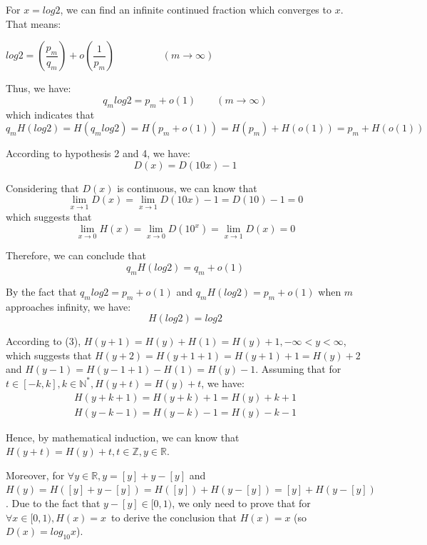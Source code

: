 \documentclass[12pt]{article}
\begin{document}
For $x=log2$, we can find an infinite continued fraction which converges to $x$. That means:\\
\begin{center}
$log2=(\dfrac{p_m}{q_m})+o(\dfrac{1}{p_m})\hspace{2cm}(m\rightarrow\infty)$
\end{center}
Thus, we have:
\begin{equation*}
q_m log2=p_m+o(1)\qquad(m\rightarrow \infty)
\end{equation*}
which indicates that 
\begin{equation*}
q_mH(log2)=H(q_mlog2)=H(p_m+o(1))=H(p_m)+H(o(1))=p_m+H(o(1))
\end{equation*}
\par According to hypothesis 2 and 4, we have:
\begin{equation*}
D(x)=D(10x)-1
\end{equation*}
\par Considering that $D(x)$ is continuous, we can know that
\begin{equation*}
\lim_{x\to1} D(x)=\lim_{x\to1}D(10x)-1=D(10)-1=0
\end{equation*}
which suggests that
\begin{equation*}
\lim_{x\to0}H(x)=\lim_{x\to0}D(10^x)=\lim_{x\to1}D(x)=0
\end{equation*}
\par Therefore, we can conclude that 
\begin{equation*}
q_mH(log2)=q_m+o(1)
\end{equation*}
\par By the fact that $q_m log2=p_m+o(1)$ and $q_mH(log2)=p_m+o(1)$ when $m$ approaches infinity, we have:
\begin{equation*}
H(log2)=log2
\end{equation*}
\par According to (3), $H(y+1)=H(y)+H(1)=H(y)+1, -\infty<y<\infty$, which suggests that $H(y+2)=H(y+1+1)=H(y+1)+1=H(y)+2$ and $H(y-1)=H(y-1+1)-H(1)=H(y)-1$. Assuming that for $t\in [-k,k], k\in \mathbb{N^*}, H(y+t)=H(y)+t$, we have:
\[
\begin{split}
H(y+k+1)=H(y+k)+1=H(y)+k+1 \\
H(y-k-1)=H(y-k)-1=H(y)-k-1
\end{split}
\]
\par Hence, by mathematical induction, we can know that $H(y+t)=H(y)+t, t\in \mathbb{Z}, y\in \mathbb{R}$.
\par Moreover, for $\forall y \in \mathbb{R}, y=[y]+y-[y]$ and $H(y)=H([y]+y-[y])=H([y])+H(y-[y])=[y]+H(y-[y])$. Due to the fact that $y-[y]\in [0,1)$, we only need to prove that for $\forall x \in [0,1), H(x)=x $\ to derive the conclusion that $H(x)=x$ (so $D(x)=log_{10}x$).
\end{document}
